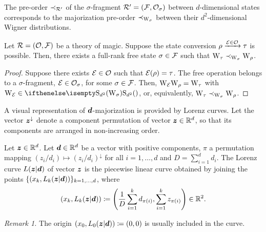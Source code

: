 
The pre-order $\prec_{\mathcal{R}'}$ of the $\sigma$-fragment $\mathcal{R}' = (\mathcal{F}, \mathcal{O}_\sigma)$ between $d$-dimensional states corresponds to the majorization pre-order $\prec_{\W{\sigma}}$ between their $d^2$-dimensional Wigner distributions.

\begin{theorem}
    Let $\mathcal{R} = (\mathcal{O}, \mathcal{F})$ be a theory of magic.
    Suppose the state conversion $\rho \xrightarrow{\mathcal{E} \in \mathcal{O}} \tau$ is possible. 
    Then, there exists a full-rank free state $\sigma \in \mathcal{F}$ such that  $\W{\tau} \prec_{\W{\sigma}} \W{\rho}$.
\end{theorem}
\begin{proof}
    Suppose there exists $\mathcal{E} \in \mathcal{O}$ such that $\mathcal{E}(\rho) = \tau$.
    The free operation belongs to a $\sigma$-fragment, $\mathcal{E} \in \mathcal{O}_\sigma$, for some $\sigma \in \mathcal{F}$.
    Then, $\W{\E}\W{\rho} = \W{\tau}$ with $\W{\E} \in \stochw$, or, equivalently, $\W{\tau} \prec_{\W{\sigma}} \W{\rho}$.
\end{proof}

A visual representation of $\bm{d}$-majorization is provided by Lorenz curves.
Let the vector $\bm{z}^\downarrow$ denote a component permutation of vector $\bm{z} \in \mathbb{R}^d$, so that its components are arranged in non-increasing order.
\begin{definition}
    Let $\bm{z} \in \mathbb{R}^d$.
    Let $\bm{d} \in \mathbb{R}^d$ be a vector with positive components, $\pi$ a permutation mapping $(z_i/d_i) \mapsto (z_i/d_i)^\downarrow$ for all $i=1,\dots,d$ and $D = \sum_{i=1}^d d_i$.
    The Lorenz curve $L(\bm{z}|\bm{d})$ of vector $\bm{z}$ is the piecewise linear curve obtained by joining the points $\{ (x_k, L_k(\bm{z}|\bm{d})) \}_{k=1,\dots,d}$, where
    \begin{equation}\label{eq:lorenz}
        (x_k, L_k(\bm{z}|\bm{d})) \coloneqq \left( \frac{1}{D}\sum_{i=1}^k d_{\pi(i)}, \sum_{i=1}^k z_{\pi(i)} \right) \in \mathbb{R}^2.
    \end{equation}
\end{definition}
\emph{Remark 1.} The origin $(x_0, L_0(\bm{z}|\bm{d})) \coloneqq (0,0)$ is usually included in the curve.

